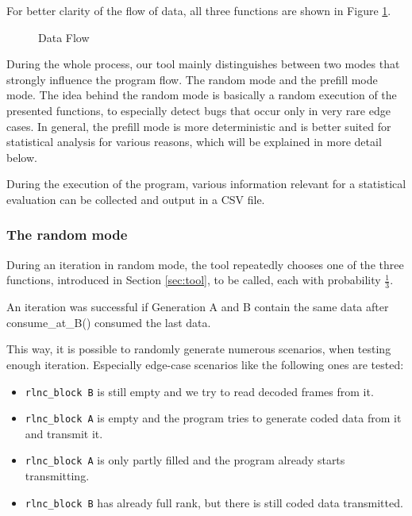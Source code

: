 \documentclass[a4paper,english,10pt]{tumarticle}
\begin{document}
For better clarity of the flow of data, all three functions are shown in Figure \ref{fig:func}.

\begin{figure}[h]
  \center
  \caption{Data Flow}
  \label{fig:func}
\end{figure}

During the whole process, our tool mainly distinguishes between two modes that strongly influence the program flow. 
The random mode and the prefill mode mode. 
The idea behind the random mode is basically a random execution of the presented functions, 
to especially detect bugs that occur only in very rare edge cases.
In general, the prefill mode is more deterministic and is better suited for 
statistical analysis for various reasons, which will be explained in more detail below.

During the execution of the program, various information relevant for a statistical evaluation can be collected and output in a CSV file.

\subsubsection{The random mode}\label{sec:random}
During an iteration in random mode, the tool repeatedly chooses one of the three functions, introduced in Section \ref{sec:tool}, 
to be called, each with probability $\frac{1}{3}$. 

An iteration was successful if Generation A and B contain the same data after consume\_at\_B() consumed the last data.

This way, it is possible to randomly generate numerous scenarios, when testing enough iteration. 
Especially edge-case scenarios like the following ones are tested:

\begin{itemize}
  \item \texttt{rlnc\_block B} is still empty and we try to read decoded frames from it.
  \item \texttt{rlnc\_block A} is empty and the program tries to generate coded data from it and transmit it.
  \item \texttt{rlnc\_block A} is only partly filled and the program already starts transmitting.
  \item \texttt{rlnc\_block B} has already full rank, but there is still coded data transmitted.
\end{itemize}
\end{document}
